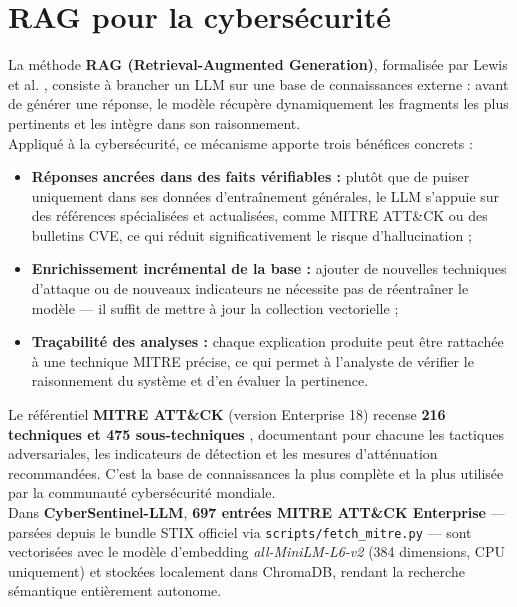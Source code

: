 \documentclass[12pt,a4paper]{report}
\begin{document}
\section{RAG pour la cybersécurité}
\begin{onehalfspace}
La méthode \textbf{RAG (Retrieval-Augmented Generation)}, formalisée par
Lewis et al. \cite{lewis2020rag}, consiste à brancher un LLM sur une base
de connaissances externe : avant de générer une réponse, le modèle récupère
dynamiquement les fragments les plus pertinents et les intègre dans son
raisonnement.\\

Appliqué à la cybersécurité, ce mécanisme apporte trois bénéfices concrets :

\begin{itemize}
  \item[\ding{43}] \textbf{Réponses ancrées dans des faits vérifiables :}
  plutôt que de puiser uniquement dans ses données d'entraînement générales,
  le LLM s'appuie sur des références spécialisées et actualisées, comme
  MITRE ATT\&CK ou des bulletins CVE, ce qui réduit significativement
  le risque d'hallucination ;
  \item[\ding{43}] \textbf{Enrichissement incrémental de la base :} ajouter
  de nouvelles techniques d'attaque ou de nouveaux indicateurs ne nécessite
  pas de réentraîner le modèle — il suffit de mettre à jour la collection
  vectorielle ;
  \item[\ding{43}] \textbf{Traçabilité des analyses :} chaque explication
  produite peut être rattachée à une technique MITRE précise, ce qui permet
  à l'analyste de vérifier le raisonnement du système et d'en évaluer
  la pertinence.
\end{itemize}

Le référentiel \textbf{MITRE ATT\&CK} (version Enterprise 18) recense
\textbf{216 techniques et 475 sous-techniques} \cite{mitre2024}, documentant
pour chacune les tactiques adversariales, les indicateurs de détection et
les mesures d'atténuation recommandées. C'est la base de connaissances la
plus complète et la plus utilisée par la communauté cybersécurité mondiale.\\

Dans \textbf{CyberSentinel-LLM}, \textbf{697 entrées MITRE ATT\&CK Enterprise}
— parsées depuis le bundle STIX officiel via \texttt{scripts/fetch\_mitre.py}
— sont vectorisées avec le modèle d'embedding \textit{all-MiniLM-L6-v2}
(384 dimensions, CPU uniquement) et stockées localement dans ChromaDB,
rendant la recherche sémantique entièrement autonome.
\end{onehalfspace}
\end{document}
